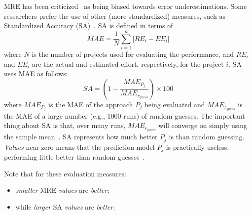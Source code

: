 \documentclass[10pt,conference]{IEEEtran}
\newcommand{\bi}{\begin{itemize}}
\newcommand{\ei}{\end{itemize}}
\begin{document}
MRE has been criticized~\cite{foss2003simulation,kitchenham2001accuracy,korte2008confidence,port2008comparative,shepperd2000building,stensrud2003further} as being biased towards error underestimations. 
Some researchers prefer the 
use of other (more standardized) measures, such as  Standardized Accuracy (SA)~\cite{langdon2016exact,shepperd2012evaluating}.
SA is defined in terms of 
\[
\mathit{MAE}=\frac{1}{N}\sum_{i=1}^n|\mathit{RE}_i-\mathit{EE}_i|
\]
where $N$ is the number of projects used for evaluating the performance, and $\mathit{RE}_i$ and $\mathit{EE}_i$ are the actual and estimated effort, respectively, for the project $i$. 
SA uses MAE as follows:
\[
\mathit{SA} = (1-\frac{\mathit{MAE}_{P_{j}}}{\mathit{MAE}_{r_{guess}}})\times 100
\]
where $\mathit{MAE}_{P_{j}}$ is the MAE of the approach $P_j$ being evaluated and $\mathit{MAE}_{r_{\mathit{guess}}}$ is the MAE of a large number (e.g., 1000 runs) of random guesses. 
The important thing about SA is that,
over many runs,  $\mathit{MAE}_{r_{\mathit{guess}}}$ will converge on simply using the sample mean~\cite{shepperd2012evaluating}. SA represents how much better $P_j$ is than random guessing. {\em Values} near zero means that the prediction model $P_j$ is practically useless, performing little better than  random guesses~\cite{shepperd2012evaluating}. 



Note that for these evaluation measures:
\bi
\item {\em smaller} MRE {\em values} are {\em better};
\item
while {\em larger} SA {\em values} are {\em better}.
\ei
\end{document}
